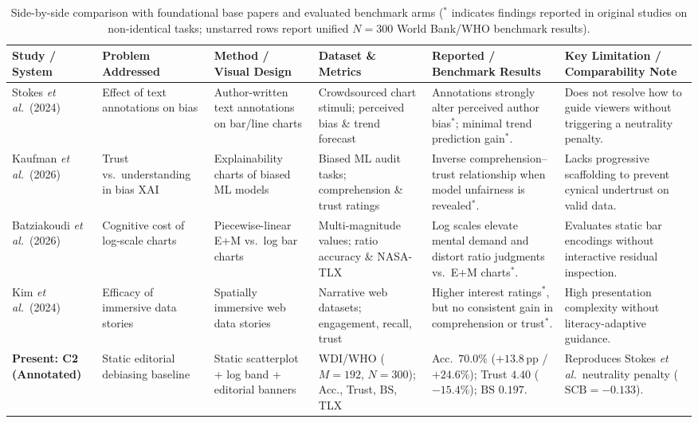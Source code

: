 \documentclass[conference]{IEEEtran}
\newcommand{\SCB}{\mathrm{SCB}}
\newcommand{\BS}{\mathrm{BS}}
\newcommand{\WdiM}{192}
\begin{document}
\begin{table}[!t]
\caption{Side-by-side comparison with foundational base papers and evaluated benchmark arms ($^{*}$ indicates findings reported in original studies on non-identical tasks; unstarred rows report unified $N = 300$ World Bank/WHO benchmark results).}
\label{tab:crossstudy}
\centering
\footnotesize
\renewcommand{\arraystretch}{1.15}
\begin{tabularx}{\textwidth}{@{}>{\raggedright\arraybackslash}p{2.5cm}>{\raggedright\arraybackslash}p{2.3cm}>{\raggedright\arraybackslash}p{2.5cm}>{\raggedright\arraybackslash}p{2.5cm}>{\raggedright\arraybackslash}p{3.0cm}Y@{}}
\toprule
\textbf{Study / System} & \textbf{Problem Addressed} & \textbf{Method / Visual Design} & \textbf{Dataset \& Metrics} & \textbf{Reported / Benchmark Results} & \textbf{Key Limitation / Comparability Note} \\
\midrule
Stokes \textit{et al.}\ (2024) \cite{stokes2024} & Effect of text annotations on bias & Author-written text annotations on bar/line charts & Crowdsourced chart stimuli; perceived bias \& trend forecast & Annotations strongly alter perceived author bias$^{*}$; minimal trend prediction gain$^{*}$. & Does not resolve how to guide viewers without triggering a neutrality penalty. \\
Kaufman \textit{et al.}\ (2026) \cite{kaufman2026} & Trust vs.\ understanding in bias XAI & Explainability charts of biased ML models & Biased ML audit tasks; comprehension \& trust ratings & Inverse comprehension--trust relationship when model unfairness is revealed$^{*}$. & Lacks progressive scaffolding to prevent cynical undertrust on valid data. \\
Batziakoudi \textit{et al.}\ (2026) \cite{batziakoudi2026} & Cognitive cost of log-scale charts & Piecewise-linear E+M vs.\ log bar charts & Multi-magnitude values; ratio accuracy \& NASA-TLX & Log scales elevate mental demand and distort ratio judgments vs.\ E+M charts$^{*}$. & Evaluates static bar encodings without interactive residual inspection. \\
Kim \textit{et al.}\ (2024) \cite{kim2024} & Efficacy of immersive data stories & Spatially immersive web data stories & Narrative web datasets; engagement, recall, trust & Higher interest ratings$^{*}$, but no consistent gain in comprehension or trust$^{*}$. & High presentation complexity without literacy-adaptive guidance. \\
\textbf{Present: C2 (Annotated)} & Static editorial debiasing baseline & Static scatterplot + log band + editorial banners & WDI/WHO ($M=\WdiM$, $N=300$); Acc., Trust, $\BS$, TLX & Acc.\ $70.0\%$ ($+13.8$\,pp / $+24.6\%$); Trust $4.40$ ($-15.4\%$); $\BS$ $0.197$. & Reproduces Stokes \textit{et al.}\ neutrality penalty ($\SCB = -0.133$). \\

\end{tabularx}
\end{table}
\end{document}
